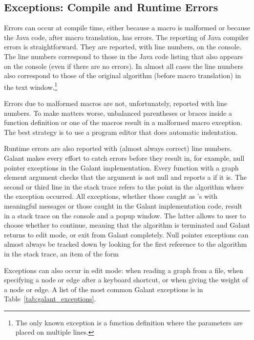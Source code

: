 \subsection{Exceptions: Compile and Runtime Errors}



Errors can occur at compile time, either because a macro is malformed or
because the Java code, after macro translation, has errors.
The reporting of Java compiler errors is straightforward. They are reported,
with line numbers, on the console. The line numbers correspond to those in
the Java code listing that also appears on the console (even if there are no
errors). In almost all cases the line numbers also correspond to those of the
original algorithm (before macro translation) in the text
window.\footnote{The only known exception is a function definition where the
  parameters are placed on multiple lines.}

Errors due to malformed macros are not, unfortunately, reported with line
numbers. To make matters worse, unbalanced parentheses or braces inside a
function definition or one of the  macros result in a
malformed macro exception. The best strategy is to use a program editor that
does automatic indentation.

Runtime errors are also reported with (almost always correct) line
numbers. Galant makes every effort to catch errors before they result in, for
example, null pointer exceptions in the Galant implementation. Every function
with a graph element argument checks that the argument is not null and
reports a  if it is.
The second or third line in the stack trace
refers to the point in the algorithm where the exception occurred.
All exceptions, whether those caught as 's with
meaningful messages or those caught in the Galant implementation code, result
in a stack trace on the console and a popup window.
The latter allows to user to choose whether to continue, meaning that the
algorithm is terminated and Galant returns to edit mode, or exit from Galant
completely.
Null pointer exceptions can almost always be tracked down by looking for the
first reference to the algorithm in the stack trace, an item of the form\\
\hspace*{4em}

Exceptions can also occur in edit mode: when reading a graph from a
file, when specifying a node or edge after a keyboard shortcut, or when
giving the weight of a node or edge.
A list of the most common Galant exceptions is in Table~\ref{tab:galant_exceptions}.

